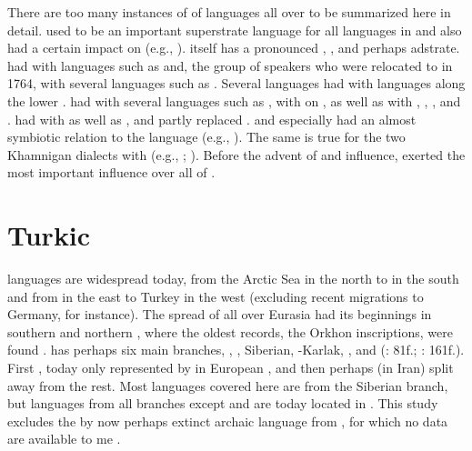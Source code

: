 There are too many instances of  of  languages all over  to be summarized here in detail.  used to be an important superstrate language for all languages in  and also had a certain impact on  (e.g., \citealt{Tsumagari1997}).  itself has a pronounced , , and perhaps  adstrate.  had  with  languages such as  and, the group of speakers who were relocated to  in 1764, with several  languages such as . Several  languages had  with  languages along the lower .  had  with several  languages such as , with  on , as well as with , , , and .  had  with  as well as , and partly replaced .  and especially  had an almost symbiotic relation to the  language  (e.g., \citealt{Janhunen1997}). The same is true for the two Khamnigan  dialects with  (e.g., \citealt{Janhunen1991}; \citealt{Janhunen2003c}). Before the advent of  and  influence,  exerted the most important influence over all of  \citep{Doerfer1985}.

\section{Turkic}\label{sec:2.11}

 languages are widespread today, from the Arctic Sea in the north to  in the south and from  in the east to Turkey in the west (excluding recent migrations to Germany, for instance). The spread of  all over Eurasia had its beginnings in southern  and northern , where the oldest  records, the Orkhon inscriptions, were found \citep{Golden1998}.  has perhaps six main branches, , , Siberian, -Karlak, , and  (\citealt{Johanson1998}: 81f.; \citealt{Johanson2006a}: 161f.). First , today only represented by  in European , and then perhaps  (in Iran) split away from the rest. Most languages covered here are from the Siberian branch, but languages from all branches except  and  are today located in . This study excludes the by now perhaps extinct archaic  language  from , for which no data are available to me \citep[148]{Shimunek2015}.

